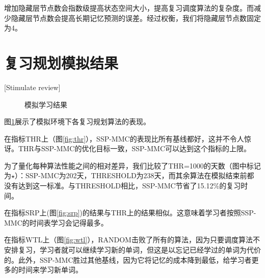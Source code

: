 增加隐藏层节点数会指数级提高状态空间大小，提高复习调度算法的复杂度。而减少隐藏层节点数会提高长期记忆预测的误差。经过权衡，我们将隐藏层节点数固定为4。

\section{复习规划模拟结果}[Stimulate review]

\begin{figure}[htbp]
    \begin{minipage}{\textwidth}
    \centering
    \subfigure{\label{fig:thr}}\addtocounter{subfigure}{-2}
    \hspace{2em}
    \subfigure{\label{fig:srp}}\addtocounter{subfigure}{-2}
    \end{minipage}
    \centering
    \begin{minipage}{\textwidth}
    \centering
    \subfigure{\label{fig:wtl}}\addtocounter{subfigure}{-2}
    \hspace{2em}
    \subfigure{\label{fig:new}}\addtocounter{subfigure}{-2}
    \end{minipage}
    \vspace{0.2em}
    \caption{模拟学习结果}
    \label{fig:simulation}
\end{figure}

图\ref{fig:simulation}展示了模拟环境下各复习规划算法的表现。

在指标THR上（图\ref{fig:thr}），SSP-MMC的表现比所有基线都好，这并不令人惊讶。THR与SSP-MMC的优化目标一致，SSP-MMC可以达到这个指标的上限。

为了量化每种算法性能之间的相对差异，我们比较了THR=1000的天数（图中标记为$\star$）：SSP-MMC为202天，THRESHOLD为238天，而其余算法在模拟结束前都没有达到这一标准。与THRESHOLD相比，SSP-MMC节省了15.12\%的复习时间。

在指标SRP上(图\ref{fig:srp})的结果与THR上的结果相似。这意味着学习者按照SSP-MMC的时间表学习会记得最多。

在指标WTL上（图\ref{fig:wtl}），RANDOM击败了所有的算法，因为只要调度算法不安排复习，学习者就可以继续学习新的单词，但这是以忘记已经学过的单词为代价的。此外，SSP-MMC胜过其他基线，因为它将记忆的成本降到最低，给学习者更多的时间来学习新单词。


